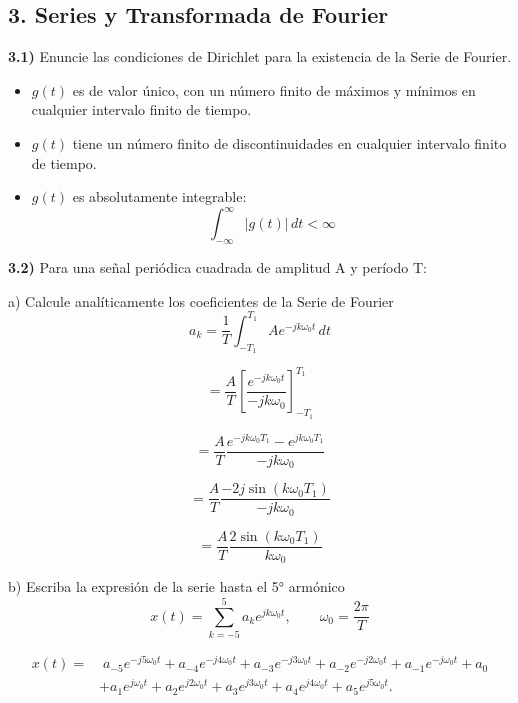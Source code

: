 \subsection*{3. Series y Transformada de Fourier}
\bigskip

\noindent \textbf{3.1)} Enuncie las condiciones de Dirichlet para la existencia de la Serie de Fourier.

\noindent \begin{itemize}
    \item $g(t)$ es de valor único, con un número finito de máximos y mínimos en cualquier intervalo finito de tiempo.
    \item $g(t)$ tiene un número finito de discontinuidades en cualquier intervalo finito de tiempo.
    \item $g(t)$ es absolutamente integrable: 
    \[
        \int_{-\infty}^{\infty} |g(t)| \, dt < \infty
    \]
\end{itemize}
\bigskip

\noindent \textbf{3.2)} Para una señal periódica cuadrada de amplitud A y período T:
\bigskip

   \noindent a) Calcule analíticamente los coeficientes de la Serie de Fourier
            \[
        a_k = \frac{1}{T} \int_{-T_1}^{T_1} A e^{-jk\omega_0 t}\,dt
        \]
        
        \[
        = \frac{A}{T} \left[ \frac{e^{-jk\omega_0 t}}{-jk\omega_0} \right]_{-T_1}^{T_1}
        \]
        
        \[
        = \frac{A}{T} \frac{e^{-jk\omega_0 T_1} - e^{jk\omega_0 T_1}}{-jk\omega_0}
        \]
        
        \[
        = \frac{A}{T}  \frac{-2j \sin(k\omega_0 T_1)}{-jk\omega_0}
        \]
        
        \[
        = \frac{A}{T}   \frac{2 \sin(k\omega_0 T_1)}{k\omega_0}
        \]
    
    \bigskip
   \noindent b) Escriba la expresión de la serie hasta el 5° armónico
    \bigskip
        \[
        x(t) = \sum_{k=-5}^{5} a_k e^{j k \omega_0 t}, 
        \qquad \omega_0 = \frac{2\pi}{T}
        \]
        
        
        \[
        \begin{aligned}
        x(t)  = & \; a_{-5} e^{-j5\omega_0 t} 
        + a_{-4} e^{-j4\omega_0 t} 
        + a_{-3} e^{-j3\omega_0 t} 
        + a_{-2} e^{-j2\omega_0 t} 
        + a_{-1} e^{-j\omega_0 t} + a_0 \\
        & + a_{1} e^{j\omega_0 t} 
        + a_{2} e^{j2\omega_0 t} 
        + a_{3} e^{j3\omega_0 t} 
        + a_{4} e^{j4\omega_0 t} 
        + a_{5} e^{j5\omega_0 t}.
        \end{aligned}
        \]
        \bigskip
        

